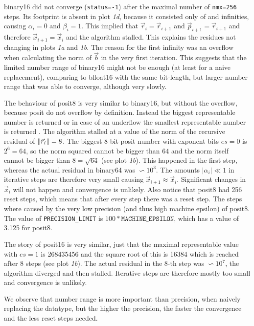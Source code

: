 \documentclass{article}
\theoremstyle{plain} %
\theoremstyle{convention} %
\theoremstyle{remark} %
\def\code#1{\texttt{#1}}
\numberwithin{equation}{section}
\begin{document}
\gls{binary16} did not converge (\code{status=-1}) after the maximal number of \code{nmx=256} steps. Its footprint is absent in plot \textit{1d}, because it consisted only of  and infinities, causing $\alpha_i = 0$ and $\beta_i = 1$. This implied that $\vec{r}_i = \vec{r}_{i+1}$ and $\vec{p}_{i+1} = \vec{r}_{i+1}$ and therefore $\vec{x}_{i+1} = \vec{x}_{i}$ and the algorithm stalled. This explains the residues not changing in plots \textit{1a} and \textit{1b}. The reason for the first infinity was an overflow when calculating the norm of $\vec{b}$ in the very first iteration. This suggests that the limited number range of \gls{binary16} might not be enough (at least for a naive replacement), comparing to \gls{bfloat16} with the same bit-length, but larger number range that was able to converge, although very slowly.

The behaviour of \gls{posit8} is very similar to \gls{binary16}, but without the overflow, because posit do not overflow by definition. Instead the biggest representable number is returned or in case of an underflow the smallest representable number is returned \cite{posit2018standard}. The algorithm stalled at a value of the norm of the recursive residual of $\norm{\vec{r}_i} = 8$. The biggest \num{8}-bit posit number with exponent bits $es=0$ is $2^6 = 64$, so the norm squared cannot be bigger than $64$ and the norm itself cannot be bigger than $8 = \sqrt{64}$ (see plot \textit{1b}). This happened in the first step, whereas the actual residual in \gls{binary64} was $\backsim 10^3$. The amounts $|\alpha_i| \ll 1$ in iterative steps are therefore very small causing $\vec{x}_{i+1} \approx \vec{x}_i$. Significant changes in $\vec{x}_i$ will not happen and convergence is unlikely. Also notice that \gls{posit8} had \num{256} reset steps, which means that after every step there was a reset step. The steps where caused by the very low precision (and thus high machine epsilon) of \gls{posit8}. The value of \code{PRECISION\_LIMIT} is $100*\code{MACHINE\_EPSILON}$, which has a value of \num{3.125} for \gls{posit8}.

The story of \gls{posit16} is very similar, just that the maximal representable value with $es=1$ is \num{268435456} and the square root of this is \num{16384} which is reached after $8$ steps (see plot \textit{1b}). The actual residual in the $8$-th step was $\backsim 10^7$, the algorithm diverged and then stalled. Iterative steps are therefore mostly too small and convergence is unlikely.

We observe that number range is more important than precision, when naively replacing the datatype, but the higher the precision, the faster the convergence and the less reset steps needed.
\end{document}
